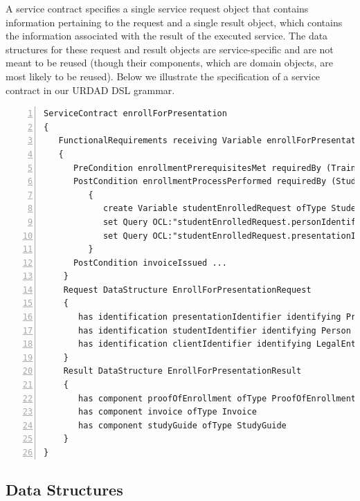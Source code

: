 {A service contract specifies a single service request object that contains information pertaining to the request and a single result object, which contains the information associated with the result of the executed service. The data structures for these request and result objects are service-specific and are not meant to be reused (though their components, which are domain objects, are most likely to be reused). Below we illustrate the specification of a service contract in our URDAD DSL grammar.
\lstset{language=urdad,caption=Specifying a service contract in the textual URDAD DSL syntax.,label=contractTextSyntax}
\small \begin{lstlisting}[numbers=left,escapechar=|]
ServiceContract enrollForPresentation
{
   FunctionalRequirements receiving Variable enrollForPresentationRequest ofType EnrollForPresentationRequest
   {
      PreCondition enrollmentPrerequisitesMet requiredBy (TrainingRegulator Student) raises EnrollmentPrerequisitesNotSatisfiedException checks constraint enrollmentPrerequisitesForPresentationMet with ValueOf enrollForPresentationRequest
      PostCondition enrollmentProcessPerformed requiredBy (Student Client TrainingRegulator) ensures constraint studentEnrolledForPresentation          with ValueOf studentEnrolledRequest constructedUsing doSequential
         {
            create Variable studentEnrolledRequest ofType StudentEnrolledRequest
            set Query OCL:"studentEnrolledRequest.personIdentifier" equalTo Query OCL:"enrollForPresentationRequest.personIdentifier"                            
            set Query OCL:"studentEnrolledRequest.presentationIdentifier" equalTo Query OCL:"enrollForPresentationRequest.presentationIdentifier"                            
         }  
      PostCondition invoiceIssued ...
    }            
    Request DataStructure EnrollForPresentationRequest 
    {
       has identification presentationIdentifier identifying Presentation
       has identification studentIdentifier identifying Person
       has identification clientIdentifier identifying LegalEntity         
    }
    Result DataStructure EnrollForPresentationResult 
    {
       has component proofOfEnrollment ofType ProofOfEnrollment
       has component invoice ofType Invoice
       has component studyGuide ofType StudyGuide
    }
}
\end{lstlisting}\normalsize

\subsection{Data Structures}

}
